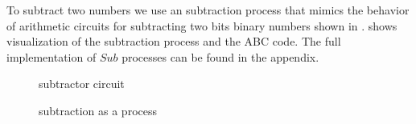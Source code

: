 To subtract two numbers we use an subtraction process that mimics the behavior of arithmetic circuits for subtracting two bits binary numbers shown in 
.
 shows visualization of the subtraction process and the ABC code.
The full implementation of $Sub$ processes can be found in the appendix.
\begin{figure}[H]%
\centering
{}
\caption{subtractor circuit}
\label{tra_subtract_circuit}%
\end{figure}
\begin{figure}[H]%
\centering
{}%
\hspace{1em}%
%
\vspace{2em}
%
\caption{subtraction as a process}
\label{tra_subttraction}%
\end{figure}
